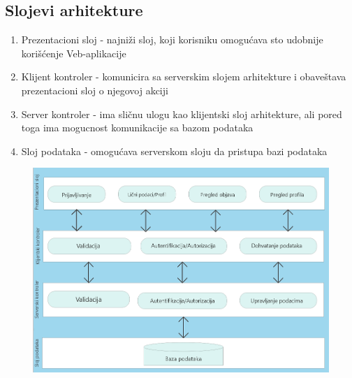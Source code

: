 \subsection{Slojevi arhitekture}
\begin{enumerate}
    \item Prezentacioni sloj - najniži sloj, koji korisniku omogućava sto udobnije korišćenje Veb-aplikacije
    \item Klijent kontroler - komunicira sa serverskim slojem arhitekture i obaveštava prezentacioni sloj o njegovoj akciji
    \item Server kontroler - ima sličnu ulogu kao klijentski sloj arhitekture, ali pored toga ima mogucnost komunikacije sa bazom podataka
    \item Sloj podataka - omogućava serverskom sloju da pristupa bazi podataka
\end{enumerate}
\begin{figure}[h!]
		\centerline{\includegraphics[width=\textwidth]{slike/arhitektura.png}}
\end{figure}

